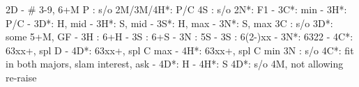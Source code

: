 2D - # 3-9, 6+M
P  : s/o
2M/3M/4H*: P/C
4S : s/o
2N*: F1
   - 3C*: min
        - 3H*: P/C 
   - 3D*: H, mid
   - 3H*: S, mid
   - 3S*: H, max
   - 3N*: S, max
3C : s/o
3D*: some 5+M, GF
   - 3H : 6+H
        - 3S : 6+S
        - 3N : 5S
   - 3S : 6(2-)xx
   - 3N*: 6322
   - 4C*: 63xx+, spl D
   - 4D*: 63xx+, spl C max
   - 4H*: 63xx+, spl C min
3N : s/o
4C*: fit in both majors, slam interest, ask
   - 4D*: H
   - 4H*: S
4D*: s/o 4M, not allowing re-raise

